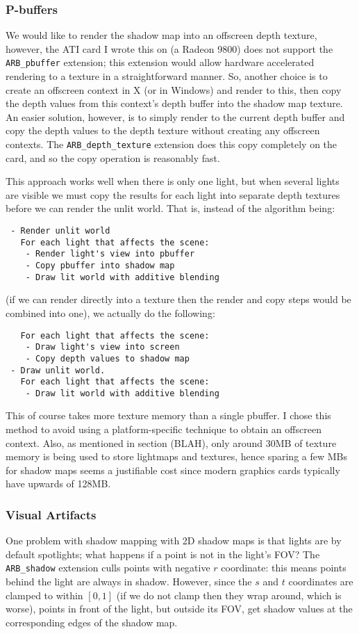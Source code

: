 \documentclass{llncs}
\begin{document}
\begin{multicols}{2}
{\subsubsection{P-buffers} We would like to render the shadow map into an offscreen 
depth texture, however, the ATI card I wrote this on (a Radeon 9800) does not support the
{\tt ARB\_pbuffer} extension; this extension would allow hardware accelerated rendering
to a texture in a straightforward manner.  So, another choice is to create an offscreen
context in X (or in Windows) and render to this, then copy the depth values from
this context's depth buffer into the shadow map texture.  An easier solution, however,
is to simply render to the current depth buffer and copy the depth values to the depth texture
without creating any offscreen contexts.  The {\tt ARB\_depth\_texture} extension does
this copy completely on the card, and so the copy operation is reasonably fast. 

This approach works well when there is only one light, but when several lights are visible we
must copy the results for each light into separate depth textures before we can render the
unlit world.  That is, instead of the algorithm being:
\begin{verbatim}
 - Render unlit world
   For each light that affects the scene:
    - Render light's view into pbuffer
    - Copy pbuffer into shadow map
    - Draw lit world with additive blending
\end{verbatim}
(if we can render directly into a texture then the render and copy steps
would be combined into one), we actually do the following:
\begin{verbatim}
   For each light that affects the scene:
    - Draw light's view into screen
    - Copy depth values to shadow map
 - Draw unlit world.
   For each light that affects the scene:
    - Draw lit world with additive blending
\end{verbatim}
This of course takes more texture memory than a single pbuffer.  
I chose this method to avoid using a platform-specific technique to obtain an offscreen
context.  Also, as mentioned in section (BLAH), only around 30MB of texture memory is 
being used to store lightmaps and textures, hence sparing a few MBs for shadow maps seems a 
justifiable cost since modern graphics cards typically have upwards of 128MB.

\subsubsection{Visual Artifacts} One problem with shadow mapping with 2D shadow maps is that
lights are by default spotlights; what happens if a point is not in the light's FOV?  
The {\tt ARB\_shadow} extension culls points with negative $r$ coordinate: 
this means points behind the light are always in shadow.  However,
since the $s$ and $t$ coordinates are clamped to within $[0,1]$ (if we do not clamp
then they wrap around, which is worse), points in front of the
light, but outside its FOV, get shadow values at the corresponding edges of the shadow map.

}
\end{multicols}
\end{document}
